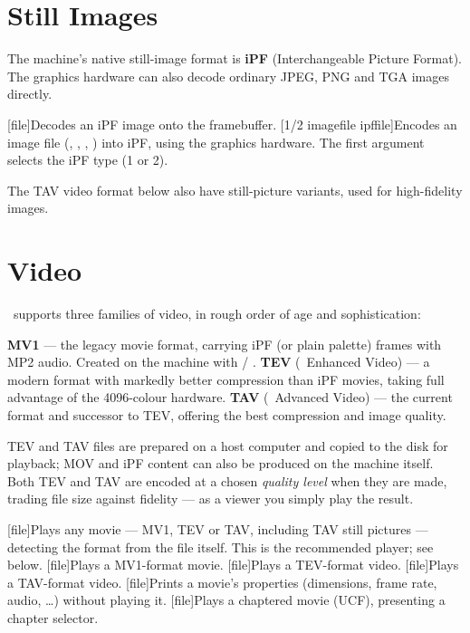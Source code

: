 \section{Still Images}

The machine's native still-image format is \textbf{iPF} (Interchangeable Picture Format). The graphics hardware can also decode ordinary JPEG, PNG and TGA images directly.

\begin{outline}
\1[file]{Decodes an iPF image onto the framebuffer.}
\1[1/2 imagefile ipffile]{Encodes an image file (, , , ) into iPF, using the graphics hardware. The first argument selects the iPF type (1 or 2).}
\end{outline}

The TAV video format below also have still-picture variants, used for high-fidelity images.

\section{Video}

\thedos\ supports three families of video, in rough order of age and sophistication:

\begin{outline}
\1\textbf{MV1} --- the legacy movie format, carrying iPF (or plain palette) frames with MP2 audio. Created on the machine with  / .
\1\textbf{TEV} (\thismachine\ Enhanced Video) --- a modern format with markedly better compression than iPF movies, taking full advantage of the 4096-colour hardware.
\1\textbf{TAV} (\thismachine\ Advanced Video) --- the current format and successor to TEV, offering the best compression and image quality.
\end{outline}

TEV and TAV files are prepared on a host computer and copied to the disk for playback; MOV and iPF content can also be produced on the machine itself. Both TEV and TAV are encoded at a chosen \emph{quality level} when they are made, trading file size against fidelity --- as a viewer you simply play the result.

\begin{outline}
\1[file]{Plays any movie --- MV1, TEV or TAV, including TAV still pictures --- detecting the format from the file itself. This is the recommended player; see below.}
\1[file]{Plays a MV1-format movie.}
\1[file]{Plays a TEV-format video.}
\1[file]{Plays a TAV-format video.}
\1[file]{Prints a movie's properties (dimensions, frame rate, audio, \dots) without playing it.}
\1[file]{Plays a chaptered movie (UCF), presenting a chapter selector.}
\end{outline}

